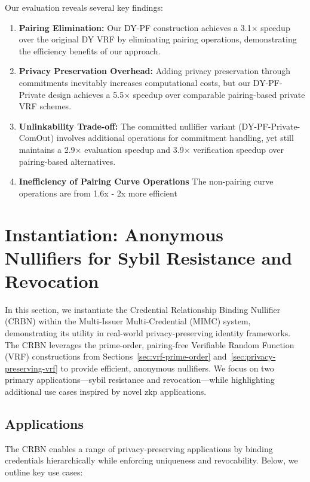 Our evaluation reveals several key findings:

\begin{enumerate}
    \item \textbf{Pairing Elimination:} Our DY-PF construction achieves a 3.1× speedup over the original DY VRF by eliminating pairing operations, demonstrating the efficiency benefits of our approach.
    
    \item \textbf{Privacy Preservation Overhead:} Adding privacy preservation through commitments inevitably increases computational costs, but our DY-PF-Private design achieves a 5.5× speedup over comparable pairing-based private VRF schemes.
    
    \item \textbf{Unlinkability Trade-off:} The committed nullifier variant (DY-PF-Private-ComOut) involves additional operations for commitment handling, yet still maintains a 2.9× evaluation speedup and 3.9× verification speedup over pairing-based alternatives.

    \item \textbf{Inefficiency of Pairing Curve Operations} The non-pairing curve operations are from 1.6x - 2x more efficient
\end{enumerate}


\section{Instantiation: Anonymous Nullifiers for Sybil Resistance and Revocation}\label{sec-vrf-instantiation}

In this section, we instantiate the Credential Relationship Binding Nullifier (CRBN) within the Multi-Issuer Multi-Credential (MIMC) system, demonstrating its utility in real-world privacy-preserving identity frameworks. The CRBN leverages the prime-order, pairing-free Verifiable Random Function (VRF) constructions from Sections~\ref{sec:vrf-prime-order} and~\ref{sec:privacy-preserving-vrf} to provide efficient, anonymous nullifiers. We focus on two primary applications—sybil resistance and revocation—while highlighting additional use cases inspired by novel zkp applications. 

\subsection{Applications}\label{subsec:applications}

The CRBN enables a range of privacy-preserving applications by binding credentials hierarchically while enforcing uniqueness and revocability. Below, we outline key use cases:

